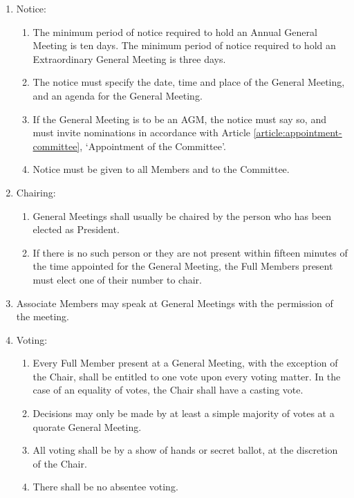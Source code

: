 \documentclass[12pt]{constitution}
\begin{document}
\begin{enumerate}
    \item Notice:
    \begin{enumerate}
        \item The minimum period of notice required to hold an Annual General Meeting is ten days.  The minimum period of notice required to hold an Extraordinary General Meeting is three days.
        \item The notice must specify the date, time and place of the General Meeting, and an agenda for the General Meeting.
        \item If the General Meeting is to be an AGM, the notice must say so, and must invite nominations in accordance with Article \ref{article:appointment-committee}, `Appointment of the Committee'.
        \item Notice must be given to all Members and to the Committee.
    \end{enumerate}

    \item Chairing:
    \begin{enumerate}
        \item General Meetings shall usually be chaired by the person who has been elected as President.
        \item If there is no such person or they are not present within fifteen minutes of the time appointed for the General Meeting, the Full Members present must elect one of their number to chair.
    \end{enumerate}

    \item Associate Members may speak at General Meetings with the permission of the meeting.

    \item Voting:
    \begin{enumerate}
        \item Every Full Member present at a General Meeting, with the exception of the Chair, shall be entitled to one vote upon every voting matter.  In the case of an equality of votes, the Chair shall have a casting vote.
        \item Decisions may only be made by at least a simple majority of votes at a quorate General Meeting.
        \item All voting shall be by a show of hands or secret ballot, at the discretion of the Chair.
        \item There shall be no absentee voting.
    \end{enumerate}


\end{enumerate}
\end{document}
